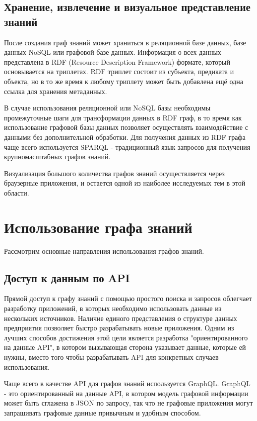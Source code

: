 \subsection{Хранение, извлечение и визуальное представление знаний}

После создания граф знаний может храниться в реляционной базе данных, базе данных NoSQL или графовой базе данных. Информация о всех данных
представлена в RDF (Resource Description Framework) формате, который основывается на триплетах. RDF триплет состоит из субъекта, предиката и
объекта, но в то же время к любому триплету может быть добавлена ещё одна ссылка для хранения метаданных.

В случае использования реляционной или NoSQL базы необходимы промежуточные шаги для трансформации данных в RDF граф, в то время как
использование графовой базы данных позволяет осуществлять взаимодействие с данными без дополнительной обработки. Для получения данных из RDF
графа чаще всего используется SPARQL - традиционный язык запросов для получения крупномасштабных графов знаний.

Визуализация большого количества графов знаний осуществляется через браузерные приложения, и остается одной из наиболее исследуемых тем в этой области.


\section{Использование графа знаний}

Рассмотрим основные направления использования графов знаний.

\subsection{Доступ к данным по API}

Прямой доступ к графу знаний с помощью простого поиска и запросов облегчает разработку приложений, в которых необходимо использовать данные
из нескольких источников. Наличие единого представления о структуре данных предприятия позволяет быстро разрабатывать новые приложения.
Одним из лучших способов достижения этой цели является разработка "ориентированного на данные API", в котором вызывающая сторона указывает
данные, которые ей нужны, вместо того чтобы разрабатывать API для конкретных случаев использования.

Чаще всего в качестве API для графов знаний используется GraphQL. GraphQL - это ориентированный на данные API, в котором модель графовой
информации может быть сглажена в JSON по запросу, так что не графовые приложения могут запрашивать графовые данные привычным и удобным способом.

